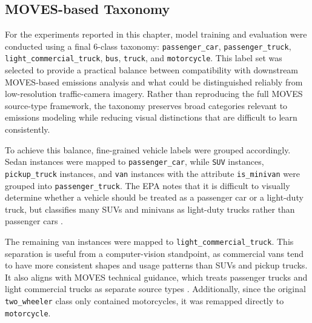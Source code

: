 
\subsection{MOVES-based Taxonomy}
\label{sec:moves-taxonomy}

For the experiments reported in this chapter, model training and evaluation were 
conducted using a final 6-class taxonomy: 
\verb|passenger_car|, \verb|passenger_truck|, \verb|light_commercial_truck|, 
\verb|bus|, \verb|truck|, and \verb|motorcycle|. 
This label set was selected to provide a practical balance between compatibility
with downstream MOVES-based emissions analysis and what could be distinguished 
reliably from low-resolution traffic-camera imagery. Rather than reproducing the
full MOVES source-type framework, the taxonomy preserves broad categories relevant 
to emissions modeling while reducing visual distinctions that are difficult to 
learn consistently.

To achieve this balance, fine-grained vehicle labels were grouped accordingly. 
Sedan instances were mapped to \verb|passenger_car|, while \verb|SUV| instances, 
\verb|pickup_truck| instances, and \verb|van| instances with the attribute \verb|is_minivan| 
 were grouped into \verb|passenger_truck|. The EPA notes that it is 
difficult to visually determine whether a vehicle should be treated as a 
passenger car or a light-duty truck, but classifies many SUVs and minivans as 
light-duty trucks rather than passenger cars \cite{USEPA_def_truck_2019}. 

The remaining van instances were mapped to \verb|light_commercial_truck|. 
This separation is useful from a computer-vision standpoint, as commercial vans 
tend to have more consistent shapes and usage patterns than SUVs and pickup trucks.
It also aligns with MOVES technical guidance, which treats passenger trucks and 
light commercial trucks as separate source types \cite{us_epa_moves3_2020}. 
Additionally, since the original \verb|two_wheeler| class only contained 
motorcycles, it was remapped directly to \verb|motorcycle|.

